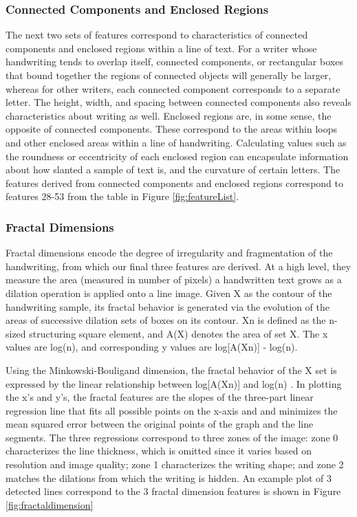 \documentclass[paper=a4, fontsize=11pt]{scrartcl} %
\numberwithin{equation}{section} %
\numberwithin{figure}{section} %
\numberwithin{table}{section} %
\begin{document}
\subsubsection{Connected Components and Enclosed Regions}
The next two sets of features correspond to characteristics of
connected components and enclosed regions within a line of text. For a
writer whose handwriting tends to overlap itself, connected
components, or rectangular boxes that bound together the regions of
connected objects will generally be larger, whereas for other writers,
each connected component corresponds to a separate letter. The height,
width, and spacing between connected components also reveals
characteristics about writing as well. Enclosed regions are, in some
sense, the opposite of connected components. These correspond to the
areas within loops and other enclosed areas within a line of
handwriting. Calculating values such as the roundness or eccentricity
of each enclosed region can encapsulate information about how slanted
a sample of text is, and the curvature of certain letters. The
features derived from connected components and enclosed regions
correspond to features 28-53 from the table in Figure
\ref{fig:featureList}.

\subsubsection{Fractal Dimensions}
Fractal dimensions encode the degree of irregularity and fragmentation
of the handwriting, from which our final three features are
derived\cite{FractalDimensions}. At a high level, they measure the
area (measured in number of pixels) a handwritten text grows as a
dilation operation is applied onto a line image. Given X as the
contour of the handwriting sample, its fractal behavior is generated
via the evolution of the areas of successive dilation sets of boxes on
its contour. Xn is defined as the n-sized structuring square element,
and A(X) denotes the area of set X. The x values are log(n), and
corresponding y values are log[A(Xn)] - log(n).

Using the Minkowski-Bouligand dimension, the fractal behavior of the X
set is expressed by the linear relationship between log[A(Xn)] and
log(n) \cite{SyntheticParameters}. In plotting the x's and y's, the
fractal features are the slopes of the three-part linear regression
line that fits all possible points on the x-axis and and minimizes the
mean squared error between the original points of the graph and the
line segments\cite{GeometricalFeatures}.  The three regressions
correspond to three zones of the image: zone 0 characterizes the line
thickness, which is omitted since it varies based on resolution and
image quality; zone 1 characterizes the writing shape; and zone 2
matches the dilations from which the writing is hidden. An example
plot of 3 detected lines correspond to the 3 fractal dimension
features is shown in Figure \ref{fig:fractaldimension}
\end{document}

